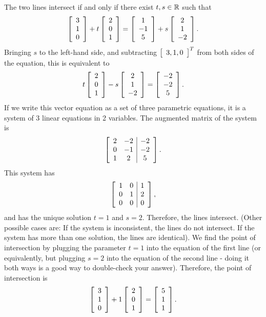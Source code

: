 \documentclass{ximera}
\begin{document}
\begin{solution}
  The two lines intersect if and only if there exist $t,s\in\R$ such
  that
  \begin{equation*}
    \startmat{c} 3 \\ 1 \\ 0 \stopmat
    + t \startmat{c} 2 \\ 0 \\ 1 \stopmat
    = \startmat{c} 1 \\ -1 \\ 5 \stopmat
    + s \startmat{c} 2 \\ 1 \\ -2 \stopmat.
  \end{equation*}
  Bringing $s$ to the left-hand side, and subtracting $\startmat{c}3,1,0\stopmat^T$
  from both sides of the equation, this is equivalent to
  \begin{equation*}
    t \startmat{c} 2 \\ 0 \\ 1 \stopmat
    - s \startmat{c} 2 \\ 1 \\ -2 \stopmat
    = \startmat{c} -2 \\ -2 \\ 5 \stopmat.
  \end{equation*}
  If we write this vector equation as a set of three parametric
  equations, it is a system of 3 linear equations in 2 variables. The
  augmented matrix of the system is
  \begin{equation*}
    \startmat{cc|c}
      2 & -2 & -2 \\
      0 & -1 & -2 \\
      1 & 2 & 5   \\
    \stopmat.
  \end{equation*}
  This system has {\rref}
  \begin{equation*}
    \startmat{cc|c}
      1 & 0 & 1 \\
      0 & 1 & 2 \\
      0 & 0 & 0 \\
    \stopmat,
  \end{equation*}
  and has the unique solution $t=1$ and $s=2$. Therefore, the lines
  intersect. (Other possible cases are: If the system is inconsistent,
  the lines do not intersect. If the system has more than one
  solution, the lines are identical). We find the point of
  intersection by plugging the parameter $t=1$ into the equation of
  the first line (or equivalently, but plugging $s=2$ into the
  equation of the second line - doing it both ways is a good way to
  double-check your answer). Therefore, the point of intersection is
  \begin{equation*}
    \startmat{c} 3 \\ 1 \\ 0 \stopmat
    + 1 \startmat{c} 2 \\ 0 \\ 1 \stopmat
    = \startmat{c} 5 \\ 1 \\ 1 \stopmat.
  \end{equation*}
\end{solution}
\end{document}
